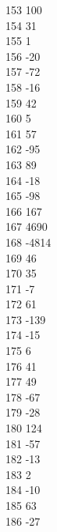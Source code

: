 { 153	100 \\
 154	31 \\
 155	1 \\
 156	-20 \\
 157	-72 \\
 158	-16 \\
 159	42 \\
 160	5 \\
 161	57 \\
 162	-95 \\
 163	89 \\
 164	-18 \\
 165	-98 \\
 166	167 \\
 167	4690 \\
 168	-4814 \\
 169	46 \\
 170	35 \\
 171	-7 \\
 172	61 \\
 173	-139 \\
 174	-15 \\
 175	6 \\
 176	41 \\
 177	49 \\
 178	-67 \\
 179	-28 \\
 180	124 \\
 181	-57 \\
 182	-13 \\
 183	2 \\
 184	-10 \\
 185	63 \\
 186	-27 \\
}
